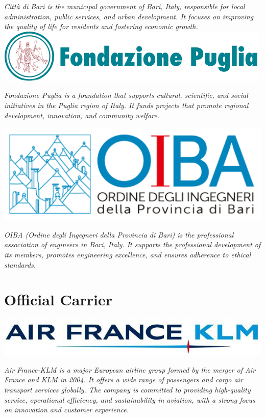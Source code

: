\documentclass[
	openany, %
	parskip=full, %
	12pt, %
	a4paper, %
]{conferencebooklet} %
\begin{document}
\begin{multicols*}{2}
    \textit{Città di Bari is the municipal government of Bari, Italy, responsible for local administration, public services, and urban development. It focuses on improving the quality of life for residents and fostering economic growth.} \\
    
    \hfill\includegraphics[width=\sponsorscaling\linewidth]{logos/puglia.png}\hspace*{\fill}

    \textit{Fondazione Puglia is a foundation that supports cultural, scientific, and social initiatives in the Puglia region of Italy. It funds projects that promote regional development, innovation, and community welfare.}

    \hfill\includegraphics[width=\sponsorscaling\linewidth]{logos/oiba.png}\hspace*{\fill}

    \textit{OIBA (Ordine degli Ingegneri della Provincia di Bari) is the professional association of engineers in Bari, Italy. It supports the professional development of its members, promotes engineering excellence, and ensures adherence to ethical standards.} \\
    
    
    \section{Official Carrier}
    \hfill\includegraphics[width=\sponsorscaling\linewidth]{logos/airline.jpg}\hspace*{\fill}

    \textit{Air France-KLM is a major European airline group formed by the merger of Air France and KLM in 2004. It offers a wide range of passengers and cargo air transport services globally. The company is committed to providing high-quality service, operational efficiency, and sustainability in aviation, with a strong focus on innovation and customer experience.}

\vfill\null
\end{multicols*}
\end{document}
